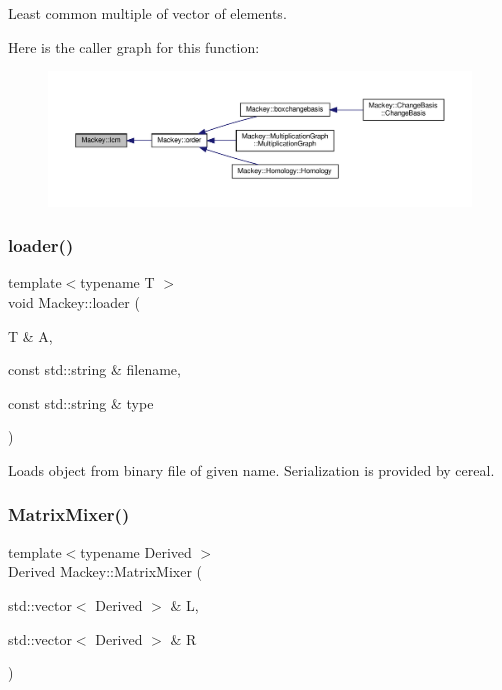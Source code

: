 Least common multiple of vector of elements. 

Here is the caller graph for this function\+:\nopagebreak
\begin{figure}[H]
\begin{center}
\leavevmode
\includegraphics[width=350pt]{namespaceMackey_a5d8ae76ffb9440e27bfca124d26ee1b2_icgraph}
\end{center}
\end{figure}
\mbox{\label{namespaceMackey_a735958355cdca12e0d312b7e604f28bc}} 
\subsubsection{\texorpdfstring{loader()}{loader()}}
{\footnotesize\ttfamily template$<$typename T $>$ \\
void Mackey\+::loader (\begin{DoxyParamCaption}\item[{T \&}]{A,  }\item[{const std\+::string \&}]{filename,  }\item[{const std\+::string \&}]{type }\end{DoxyParamCaption})}



Loads object from binary file of given name. Serialization is provided by cereal. 

\mbox{\label{namespaceMackey_a993f40280c4b6eae358e8c1bb4daa290}} 
\subsubsection{\texorpdfstring{Matrix\+Mixer()}{MatrixMixer()}}
{\footnotesize\ttfamily template$<$typename Derived $>$ \\
Derived Mackey\+::\+Matrix\+Mixer (\begin{DoxyParamCaption}\item[{std\+::vector$<$ Derived $>$ \&}]{L,  }\item[{std\+::vector$<$ Derived $>$ \&}]{R }\end{DoxyParamCaption})}



